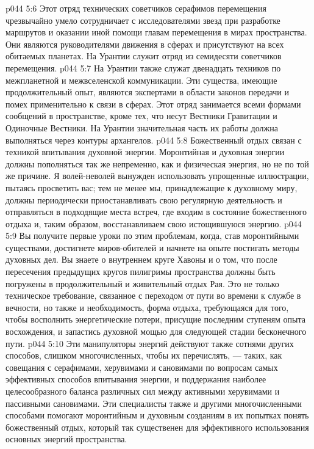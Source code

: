 \vs p044 5:6 \bibnobreakspace {} Этот отряд технических советчиков серафимов перемещения чрезвычайно умело сотрудничает с исследователями звезд при разработке маршрутов и оказании иной помощи главам перемещения в мирах пространства. Они являются руководителями движения в сферах и присутствуют на всех обитаемых планетах. На Урантии служит отряд из семидесяти советчиков перемещения.
\vs p044 5:7 \bibnobreakspace {} На Урантии также служат двенадцать техников по межпланетной и межвселенской коммуникации. Эти существа, имеющие продолжительный опыт, являются экспертами в области законов передачи и помех применительно к связи в сферах. Этот отряд занимается всеми формами сообщений в пространстве, кроме тех, что несут Вестники Гравитации и Одиночные Вестники. На Урантии значительная часть их работы должна выполняться через контуры архангелов.
\vs p044 5:8 \bibnobreakspace {} Божественный отдых связан с техникой впитывания духовной энергии. Моронтийная и духовная энергии должны пополняться так же непременно, как и физическая энергия, но не по той же причине. Я волей\hyp{}неволей вынужден использовать упрощенные иллюстрации, пытаясь просветить вас; тем не менее мы, принадлежащие к духовному миру, должны периодически приостанавливать свою регулярную деятельность и отправляться в подходящие места встреч, где входим в состояние божественного отдыха и, таким образом, восстанавливаем свою истощившуюся энергию.
\vs p044 5:9 Вы получите первые уроки по этим проблемам, когда, став моронтийными существами, достигнете миров\hyp{}обителей и начнете на опыте постигать методы духовных дел. Вы знаете о внутреннем круге Хавоны и о том, что после пересечения предыдущих кругов пилигримы пространства должны быть погружены в продолжительный и живительный отдых Рая. Это не только техническое требование, связанное с переходом от пути во времени к службе в вечности, но также и необходимость, форма отдыха, требующаяся для того, чтобы восполнить энергетические потери, присущие последним ступеням опыта восхождения, и запастись духовной мощью для следующей стадии бесконечного пути.
\vs p044 5:10 Эти манипуляторы энергий действуют также сотнями других способов, слишком многочисленных, чтобы их перечислять, --- таких, как совещания с серафимами, херувимами и сановимами по вопросам самых эффективных способов впитывания энергии, и поддержания наиболее целесообразного баланса различных сил между активными херувимами и пассивными сановимами. Эти специалисты также и другими многочисленными способами помогают моронтийным и духовным созданиям в их попытках понять божественный отдых, который так существенен для эффективного использования основных энергий пространства.
